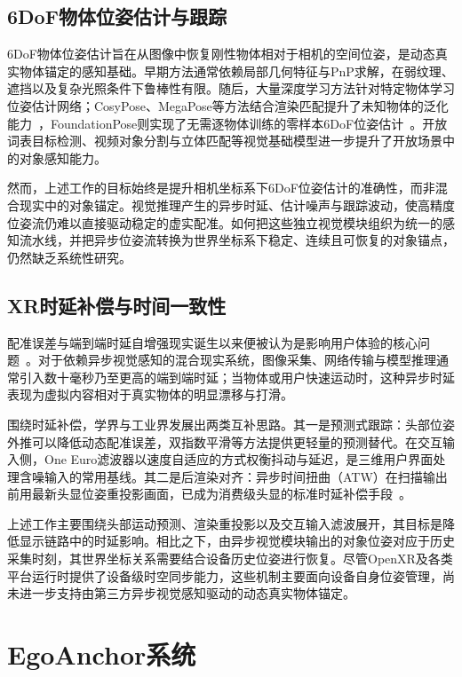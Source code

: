 \documentclass[review]{vgtc}
\begin{document}
\subsection{6DoF物体位姿估计与跟踪}

6DoF物体位姿估计旨在从图像中恢复刚性物体相对于相机的空间位姿，是动态真实物体锚定的感知基础。早期方法通常依赖局部几何特征与PnP求解，在弱纹理、遮挡以及复杂光照条件下鲁棒性有限。随后，大量深度学习方法针对特定物体学习位姿估计网络；CosyPose、MegaPose等方法结合渲染匹配提升了未知物体的泛化能力~\cite{cosypose2020,megapose2022}，FoundationPose则实现了无需逐物体训练的零样本6DoF位姿估计~\cite{foundationpose2023}。开放词表目标检测、视频对象分割与立体匹配等视觉基础模型进一步提升了开放场景中的对象感知能力。

然而，上述工作的目标始终是提升相机坐标系下6DoF位姿估计的准确性，而非混合现实中的对象锚定。视觉推理产生的异步时延、估计噪声与跟踪波动，使高精度位姿流仍难以直接驱动稳定的虚实配准。如何把这些独立视觉模块组织为统一的感知流水线，并把异步位姿流转换为世界坐标系下稳定、连续且可恢复的对象锚点，仍然缺乏系统性研究。

\subsection{XR时延补偿与时间一致性}

配准误差与端到端时延自增强现实诞生以来便被认为是影响用户体验的核心问题~\cite{azuma1994improving,diluca2010latency}。对于依赖异步视觉感知的混合现实系统，图像采集、网络传输与模型推理通常引入数十毫秒乃至更高的端到端时延；当物体或用户快速运动时，这种异步时延表现为虚拟内容相对于真实物体的明显漂移与打滑。

围绕时延补偿，学界与工业界发展出两类互补思路。其一是预测式跟踪：头部位姿外推可以降低动态配准误差，双指数平滑等方法提供更轻量的预测替代。在交互输入侧，One Euro滤波器以速度自适应的方式权衡抖动与延迟，是三维用户界面处理含噪输入的常用基线。其二是后渲染对齐：异步时间扭曲（ATW）在扫描输出前用最新头显位姿重投影画面，已成为消费级头显的标准时延补偿手段~\cite{vanwaveren2016atw}。

上述工作主要围绕头部运动预测、渲染重投影以及交互输入滤波展开，其目标是降低显示链路中的时延影响。相比之下，由异步视觉模块输出的对象位姿对应于历史采集时刻，其世界坐标关系需要结合设备历史位姿进行恢复。尽管OpenXR及各类平台运行时提供了设备级时空同步能力，这些机制主要面向设备自身位姿管理，尚未进一步支持由第三方异步视觉感知驱动的动态真实物体锚定。

\section{EgoAnchor系统}\label{sec:system}
\end{document}
